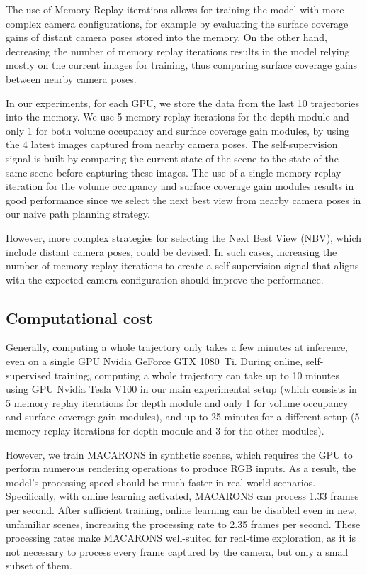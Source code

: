 The use of Memory Replay iterations allows for training the model with more complex camera configurations, for example by evaluating the surface coverage gains of distant camera poses stored into the memory.
On the other hand, decreasing the number of memory replay iterations results in the model relying mostly on the current images for training, thus comparing surface coverage gains between nearby camera poses.

In our experiments, for each GPU, we store the data from the last 10 trajectories into the memory. We use 5 memory replay iterations for the depth module and only 1 for both volume occupancy and surface coverage gain modules, by using the 4 latest images captured from nearby camera poses. The self-supervision signal is built by comparing the current state of the scene to the state of the same scene before capturing these images.
The use of a single memory replay iteration for the volume occupancy and surface coverage gain modules results in good performance since we select the next best view from nearby camera poses in our naive path planning strategy.

However, more complex strategies for selecting the Next Best View (NBV), which include distant camera poses, could be devised. In such cases, increasing the number of memory replay iterations to create a self-supervision signal that aligns with the expected camera configuration should improve the performance.
%

\subsection{Computational cost}

Generally, computing a whole trajectory only takes a few minutes at inference, even on a single GPU Nvidia GeForce GTX 1080~Ti. During online, self-supervised training, computing a whole trajectory can take up to 10 minutes using GPU Nvidia Tesla V100 in our main experimental setup (which consists in 5 memory replay iterations for depth module and only 1 for volume occupancy and surface coverage gain modules), and up to 25 minutes for a different setup (5 memory replay iterations for depth module and 3 for the other modules).

However, we train MACARONS in synthetic scenes, which requires the GPU to perform numerous rendering operations to produce RGB inputs. As a result, the model's processing speed should be much faster in real-world scenarios. Specifically, with online learning activated, MACARONS can process 1.33 frames per second. After sufficient training, online learning can be disabled even in new, unfamiliar scenes, increasing the processing rate to 2.35 frames per second.
%
These processing rates make MACARONS well-suited for real-time exploration, as it is not necessary to process every frame captured by the camera, but only a small subset of them.

